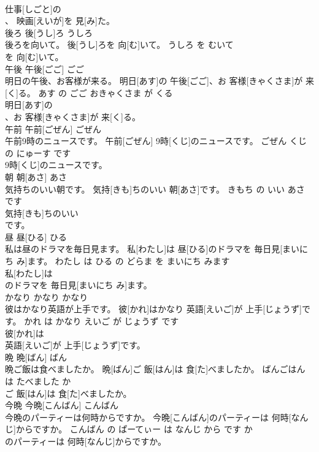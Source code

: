 \documentclass[8pt]{extreport}
\begin{document}
\begin{CJK}{UTF8}{min}
\\	仕事[しごと]の
\\	、 映画[えいが]を 見[み]た。		
\\	後ろ	後[うし]ろ	うしろ	
\\	後ろを向いて。	後[うし]ろを 向[む]いて。	うしろ を むいて	
\\	を 向[む]いて。		
\\	午後	午後[ごご]	ごご	
\\	明日の午後、お客様が来る。	明日[あす]の 午後[ごご]、お 客様[きゃくさま]が 来[く]る。	あす の ごご おきゃくさま が くる	
\\	明日[あす]の
\\	、お 客様[きゃくさま]が 来[く]る。		
\\	午前	午前[ごぜん]	ごぜん	
\\	午前9時のニュースです。	午前[ごぜん] 9時[くじ]のニュースです。	ごぜん くじ の にゅーす です	
\\	9時[くじ]のニュースです。		
\\	朝	朝[あさ]	あさ	
\\	気持ちのいい朝です。	気持[きも]ちのいい 朝[あさ]です。	きもち の いい あさ です	
\\	気持[きも]ちのいい
\\	です。		
\\	昼	昼[ひる]	ひる	
\\	私は昼のドラマを毎日見ます。	私[わたし]は 昼[ひる]のドラマを 毎日見[まいにち み]ます。	わたし は ひる の どらま を まいにち みます	
\\	私[わたし]は
\\	のドラマを 毎日見[まいにち み]ます。		
\\	かなり	かなり	かなり	
\\	彼はかなり英語が上手です。	彼[かれ]はかなり 英語[えいご]が 上手[じょうず]です。	かれ は かなり えいご が じょうず です	
\\	彼[かれ]は
\\	英語[えいご]が 上手[じょうず]です。		
\\	晩	晩[ばん]	ばん	
\\	晩ご飯は食べましたか。	晩[ばん]ご 飯[はん]は 食[た]べましたか。	ばんごはん は たべました か	
\\	ご 飯[はん]は 食[た]べましたか。		
\\	今晩	今晩[こんばん]	こんばん	
\\	今晩のパーティーは何時からですか。	今晩[こんばん]のパーティーは 何時[なんじ]からですか。	こんばん の ぱーてぃー は なんじ から です か	
\\	のパーティーは 何時[なんじ]からですか。		

\end{CJK}
\end{document}
